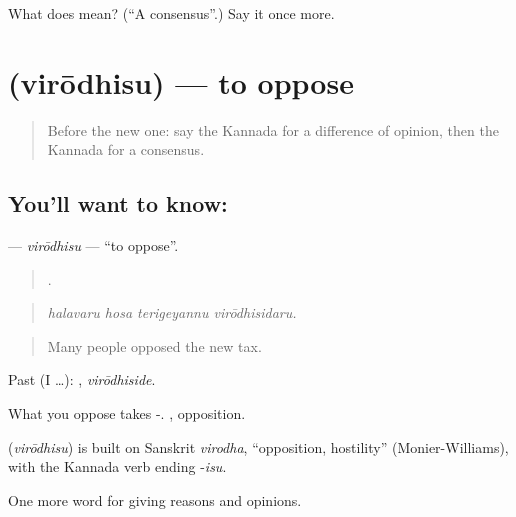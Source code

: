 \begin{tcolorbox}[breakable,colback=teal!4,colframe=teal!35!black,title={Before you move on}]
What does  mean? (\textquotedblleft{}A consensus\textquotedblright{}.) Say it once more.
\end{tcolorbox}
\section[\texorpdfstring{\kn{ವಿರೋಧಿಸು} (virōdhisu)}{ವಿರೋಧಿಸು (virōdhisu)}]{ (virōdhisu) — to oppose}

\label{lesson:KA-C379-virodhisu}



\begin{quote}
Before the new one: say the Kannada for a difference of opinion, then the Kannada for a consensus.
\end{quote}

\subsection*{You'll want to know: }
\textbf{} — \emph{virōdhisu} — \textquotedblleft{}to oppose\textquotedblright{}.

\begin{quote}
   .
\end{quote}

\begin{quote}
\emph{halavaru hosa terigeyannu virōdhisidaru.}
\end{quote}

\begin{quote}
Many people opposed the new tax.
\end{quote}

Past (I …): , \emph{virōdhiside}.

What you oppose takes -. , opposition.

\begin{cousinweb}
\textbf{} (\emph{virōdhisu}) is built on Sanskrit \emph{virodha}, \textquotedblleft{}opposition, hostility\textquotedblright{} (Monier-Williams), with the Kannada verb ending -\emph{isu}.
\end{cousinweb}

\begin{grammarlens}[title={What you've built}]
One more word for giving reasons and opinions.
\end{grammarlens}

